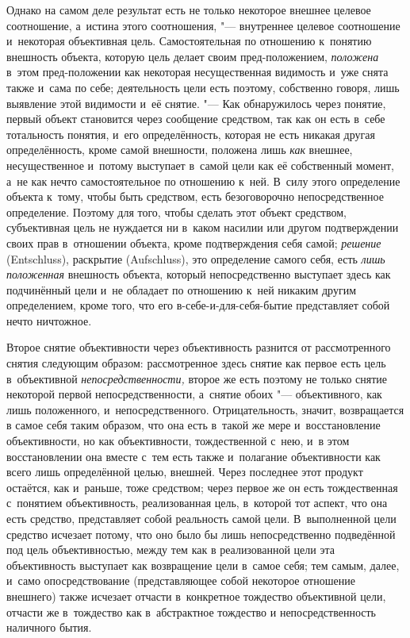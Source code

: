 Однако на самом деле результат есть не только некоторое
внешнее целевое соотношение, а~истина этого соотношения, "---
внутреннее целевое соотношение и~некоторая объективная цель.
Самостоятельная по отношению к~понятию внешность объекта, которую цель
делает своим пред-положением,
{\em положена} в~этом
пред-положении как некоторая несущественная видимость и~уже
снята также и~сама по себе; деятельность цели есть поэтому, собственно
говоря, лишь выявление этой видимости и~её снятие. "--- Как
обнаружилось через понятие, первый объект становится через сообщение
средством, так как он есть в~себе тотальность понятия, и~его
определённость, которая не есть никакая другая определённость, кроме самой
внешности, положена лишь {\em как}
внешнее, несущественное и~потому выступает в~самой цели как
её собственный момент, а~не как нечто самостоятельное по отношению к~ней.
В~силу этого определение объекта к~тому, чтобы быть средством, есть
безоговорочно непосредственное определение. Поэтому для того, чтобы сделать
этот объект средством, субъективная цель не нуждается ни в~каком насилии
или другом подтверждении своих прав в~отношении объекта, кроме
подтверждения себя самой; {\em решение}
(Entschluss), раскрытие (Aufschluss), это
определение самого себя, есть {\em лишь
положенная} внешность объекта, который непосредственно
выступает здесь как подчинённый цели и~не обладает по отношению к~ней
никаким другим определением, кроме того, что его
в-себе-и-для-себя-бытие представляет собой нечто ничтожное.

Второе снятие объективности через объективность разнится от
рассмотренного снятия следующим образом: рассмотренное здесь снятие как
первое есть цель в~объективной
{\em непосредственности,}
второе же есть поэтому не только снятие некоторой первой
непосредственности, а~снятие обоих "--- объективного, как лишь
положенного, и~непосредственного. Отрицательность, значит, возвращается в
самое себя таким образом, что она есть в~такой же мере и~восстановление
объективности, но как объективности, тождественной с~нею, и~в этом
восстановлении она вместе с~тем есть также и~полагание объективности как
всего лишь определённой целью, внешней. Через последнее этот продукт
остаётся, как и~раньше, тоже средством; через первое же он есть
тождественная с~понятием объективность, реализованная цель, в~которой тот
аспект, что она есть средство, представляет собой реальность самой цели.
В~выполненной цели средство исчезает потому, что оно было бы лишь
непосредственно подведённой под цель объективностью, между тем как в
реализованной цели эта объективность выступает как возвращение цели в~самое
себя; тем самым, далее, и~само опосредствование (представляющее собой
некоторое отношение внешнего) также исчезает отчасти в~конкретное тождество
объективной цели, отчасти же в~тождество как в~абстрактное тождество и
непосредственность наличного бытия.


